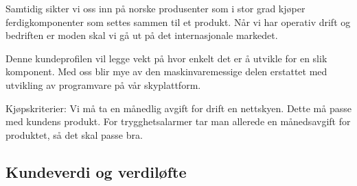 Samtidig sikter vi oss inn på norske produsenter som i stor grad kjøper
ferdigkomponenter som settes sammen til et produkt.  Når vi har operativ drift
og bedriften er moden skal vi gå ut på det internasjonale markedet.

Denne kundeprofilen vil legge vekt på hvor enkelt det er å utvikle for en slik
komponent. Med oss blir mye av den maskinvaremessige delen erstattet med
utvikling av programvare på vår skyplattform.

Kjøpskriterier: Vi må ta en månedlig avgift for drift en nettskyen. Dette må
passe med kundens produkt. For trygghetsalarmer tar man allerede en
månedsavgift for produktet, så det skal passe bra.




\subsection{Kundeverdi og verdiløfte}




